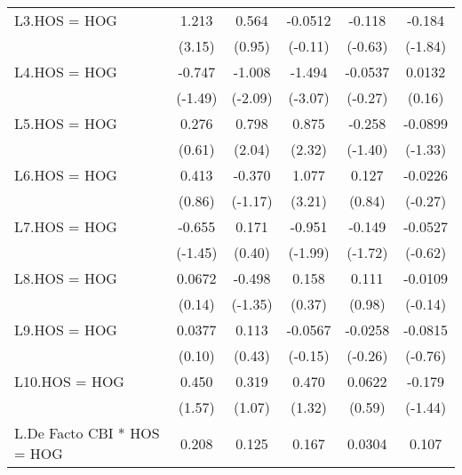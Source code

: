 {\begin{longtable}{l*{5}{c}}
\addlinespace
L3.HOS = HOG    &    1.213\sym{**} &    0.564         &  -0.0512         &   -0.118         &   -0.184         \\
                &   (3.15)         &   (0.95)         &  (-0.11)         &  (-0.63)         &  (-1.84)         \\
\addlinespace
L4.HOS = HOG    &   -0.747         &   -1.008\sym{*}  &   -1.494\sym{**} &  -0.0537         &   0.0132         \\
                &  (-1.49)         &  (-2.09)         &  (-3.07)         &  (-0.27)         &   (0.16)         \\
\addlinespace
L5.HOS = HOG    &    0.276         &    0.798\sym{*}  &    0.875\sym{*}  &   -0.258         &  -0.0899         \\
                &   (0.61)         &   (2.04)         &   (2.32)         &  (-1.40)         &  (-1.33)         \\
\addlinespace
L6.HOS = HOG    &    0.413         &   -0.370         &    1.077\sym{**} &    0.127         &  -0.0226         \\
                &   (0.86)         &  (-1.17)         &   (3.21)         &   (0.84)         &  (-0.27)         \\
\addlinespace
L7.HOS = HOG    &   -0.655         &    0.171         &   -0.951\sym{*}  &   -0.149         &  -0.0527         \\
                &  (-1.45)         &   (0.40)         &  (-1.99)         &  (-1.72)         &  (-0.62)         \\
\addlinespace
L8.HOS = HOG    &   0.0672         &   -0.498         &    0.158         &    0.111         &  -0.0109         \\
                &   (0.14)         &  (-1.35)         &   (0.37)         &   (0.98)         &  (-0.14)         \\
\addlinespace
L9.HOS = HOG    &   0.0377         &    0.113         &  -0.0567         &  -0.0258         &  -0.0815         \\
                &   (0.10)         &   (0.43)         &  (-0.15)         &  (-0.26)         &  (-0.76)         \\
\addlinespace
L10.HOS = HOG   &    0.450         &    0.319         &    0.470         &   0.0622         &   -0.179         \\
                &   (1.57)         &   (1.07)         &   (1.32)         &   (0.59)         &  (-1.44)         \\
\addlinespace
L.De Facto CBI * HOS = HOG&    0.208         &    0.125         &    0.167         &   0.0304         &    0.107\sym{*}  \\

\end{longtable}}
